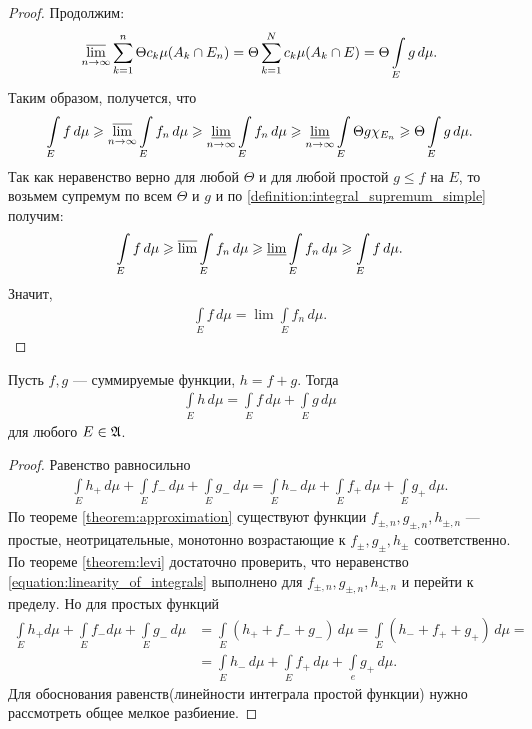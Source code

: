 \begin{proof}
Продолжим: \begin{align*}
 \varlimsup_{n \to \infty} \sum_{k=1}^{n} \Theta c_k \mu(A_k \cap E_n) = \Theta \sum_{k=1}^{N} c_k \mu(A_k \cap E) = \Theta \int\limits_E g \, d\mu
.\end{align*}  Таким образом, получется, что \begin{align*}
\int\limits_E f \, d\mu \geqslant \varlimsup_{n \to \infty} \int\limits_E f_n\, d\mu \geqslant \varliminf_{n \to \infty} \int\limits_E f_n \, d\mu \geqslant \varliminf_{n \to \infty} \int\limits_E \Theta g \chi_{E_n} \geqslant \Theta \int\limits_E g\, d\mu
.\end{align*} Так как неравенство верно для любой $\Theta$ и для любой простой $g \leqslant f$ на $E $, то возьмем супремум по всем $\Theta$ и $g$ и по \ref{definition:integral_supremum_simple} получим: \begin{align*}
\int\limits_E f \, d\mu \geqslant \varlimsup \int\limits_E f_n \, d\mu \geqslant \varliminf \int\limits_E f_n \, d\mu \geqslant \int\limits_E f \, d\mu
.\end{align*} Значит, \begin{align*}
 \int\limits_E f \, d\mu = \lim \int\limits_E f_n \, d\mu
.\end{align*} 
\end{proof}
\begin{crly}
 Пусть $f,g$ --- суммируемые функции,  $h = f + g$. Тогда \begin{align*}
  \int\limits_E h \, d\mu = \int\limits_E f\, d\mu + \int\limits_E g \, d\mu
 \end{align*} для любого $E \in \mathfrak{A}$.
\end{crly}
\begin{proof}
 Равенство равносильно 
 \begin{align}
 \label{equation:linearity_of_integrals}
  \int\limits_E h_+ \, d\mu + \int\limits_E f_- \, d\mu + \int\limits_E g_- \, d\mu = \int\limits_E h_- \, d\mu + \int\limits_E f_+ \, d\mu + \int\limits_E g_+ \, d\mu
 .\end{align} По теореме \ref{theorem:approximation} существуют функции $f_{\pm,n}, g_{\pm,n}, h_{\pm,n}$ --- простые, неотрицательные, монотонно возрастающие к  $f_{\pm}, g_{\pm}, h_{\pm}$ соответственно.
 По теореме \ref{theorem:levi} достаточно проверить, что неравенство \eqref{equation:linearity_of_integrals} выполнено для $f_{\pm,n}, g_{\pm,n}, h_{\pm,n}$ и перейти к пределу.
 Но для простых функций
 \begin{align*}
 \int\limits_E h_+ d\mu + \int\limits_E f_- d\mu + \int\limits_E g_- \,d\mu &= \int\limits_E \left( h_+ + f_- + g_- \right) \,d\mu = \int\limits_E \left( h_- + f_+ + g_+ \right) \, d\mu = \\
  &= \int\limits_E h_- \, d\mu + \int\limits_E f_+ \, d\mu + \int\limits_e g_+ \, d\mu
 .\end{align*}
 Для обоснования равенств(линейности интеграла простой функции) нужно рассмотреть общее мелкое разбиение.
\end{proof}
